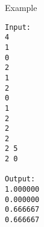 Example  
\begin{verbatim}
Input:
4
1
0
2
1
2
0
1
2
2
2
2 5
2 0

Output:
1.000000
0.000000
0.666667
0.666667
\end{verbatim}